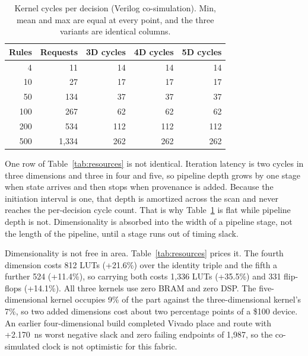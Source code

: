 \documentclass[conference]{IEEEtran}
\newcommand{\new}[1]{\textcolor{hkred}{#1}}
\begin{document}
\begin{table}[t]
\caption{Kernel cycles per decision (Verilog co-simulation). Min, mean and max are equal at every point, and the \new{three} variants are identical columns.}
\label{tab:cycles}
\centering
\begin{tabular}{rrrrr}
\toprule
Rules & Requests & \new{3D cycles} & 4D cycles & 5D cycles \\
\midrule
4 & 11 & \new{14} & 14 & 14 \\
10 & 27 & \new{17} & 17 & 17 \\
50 & 134 & \new{37} & 37 & 37 \\
100 & 267 & \new{62} & 62 & 62 \\
200 & 534 & \new{112} & 112 & 112 \\
500 & 1{,}334 & \new{262} & 262 & 262 \\
\bottomrule
\end{tabular}
\end{table}

\new{One row of Table~\ref{tab:resources} is not identical. Iteration latency is two cycles in three dimensions and three in four and five, so pipeline depth grows by one stage when state arrives and then stops when provenance is added. Because the initiation interval is one, that depth is amortized across the scan and never reaches the per-decision cycle count. That is why Table~\ref{tab:cycles} is flat while pipeline depth is not. Dimensionality is absorbed into the width of a pipeline stage, not the length of the pipeline, until a stage runs out of timing slack.}

\new{Dimensionality} is not free in area. Table~\ref{tab:resources} \new{prices it. The fourth dimension costs 812 LUTs (+21.6\%) over the identity triple and the fifth a further 524 (+11.4\%), so carrying both costs 1{,}336 LUTs (+35.5\%) and 331 flip-flops (+14.1\%). All three kernels use zero BRAM and zero DSP. The five-dimensional kernel occupies 9\% of the part against the three-dimensional kernel's 7\%, so two added dimensions cost about two percentage points of a \$100 device.} An earlier four-dimensional build completed Vivado place and route with +2.170~ns worst negative slack and zero failing endpoints of 1{,}987, so the co-simulated clock is not optimistic for this fabric.
\end{document}
